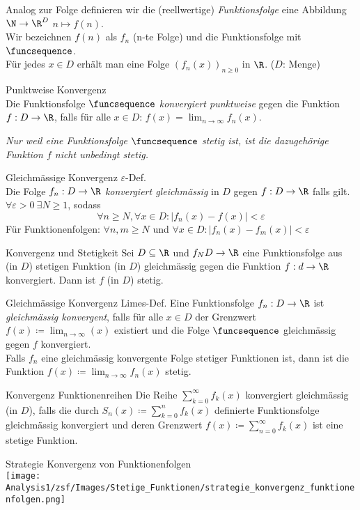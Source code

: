 
Analog zur Folge definieren wir die (reellwertige) \textit{Funktionsfolge} eine Abbildung $\N \to \R^D$ \quad $ n \mapsto f(n)$. \\
Wir bezeichnen $f(n)$ als $f_n$ (n-te Folge) und die Funktionsfolge mit $\funcsequence$. \\
Für jedes $x \in D$ erhält man eine Folge $(f_n (x))_{n \geq 0}$ in $\R$. ($D$: Menge)
\begin{definition}{Punktweise Konvergenz}\\
    Die Funktionsfolge $\funcsequence$ \emph{konvergiert punktweise} gegen die Funktion $f:D \to \R$, falls für alle $x \in D$: $f(x) = \lim_{n \to \infty} f_n (x)$.
\end{definition}
\noindent\emph{Nur weil eine Funktionsfolge $\funcsequence$ stetig ist, ist die dazugehörige Funktion $f$ nicht unbedingt stetig.}

\begin{definition}{Gleichmässige Konvergenz $\varepsilon$-Def.}\\
    Die Folge $f_n : D \to \R$ \emph{konvergiert gleichmässig} in $D$ gegen $f: D \to \R$ falls gilt. $\forall \varepsilon > 0~\exists N \geq 1$, sodass
    \begin{equation*}
        \forall n \geq N, \forall x \in D: |f_n (x) - f(x)| < \varepsilon
    \end{equation*}
    Für Funktionenfolgen: $\forall n,m \geq N$ und $\forall x \in D: |f_n(x) -  f_m(x)| < \varepsilon$
\end{definition}
\begin{theorem}{Konvergenz und Stetigkeit}
    Sei $D \subseteq \R$ und $f_ N D \to \R$ eine Funktionsfolge aus (in $D$) stetigen Funktion (in $D$) gleichmässig gegen die Funktion $f:d \to \R$ konvergiert. Dann ist $f$ (in $D$) stetig.
\end{theorem}
\begin{definition}{Gleichmässige Konvergenz Limes-Def.} 
    Eine Funktionsfolge $f_n : D \to \R$ ist \emph{gleichmässig konvergent}, falls für alle $x \in D$ der Grenzwert $f(x) \coloneqq \lim_{n \to \infty} (x)$ existiert und die Folge $\funcsequence$ gleichmässig gegen $f$ konvergiert.\\
    Falls $f_n$ eine gleichmässig konvergente Folge stetiger Funktionen ist, dann ist die Funktion $f(x) \coloneqq \lim_{n \to \infty} f_n (x)$ stetig.
\end{definition}
\begin{definition}{Konvergenz Funktionenreihen}
    Die Reihe $\sum_{k=0}^\infty f_k(x)$ konvergiert gleichmässig (in $D$), falls die durch $S_n (x) \coloneqq \sum_{k=0}^n f_k (x)$ definierte Funktionsfolge gleichmässig konvergiert 
    und deren Grenzwert $f(x) \coloneqq \sum_{n=0}^\infty f_k(x)$
    ist eine stetige Funktion.
\end{definition}
\begin{KR}{Strategie Konvergenz von Funktionenfolgen}\\
    \texttt{[image: Analysis1/zsf/Images/Stetige\_Funktionen/strategie\_konvergenz\_funktionenfolgen.png]}
\end{KR}
